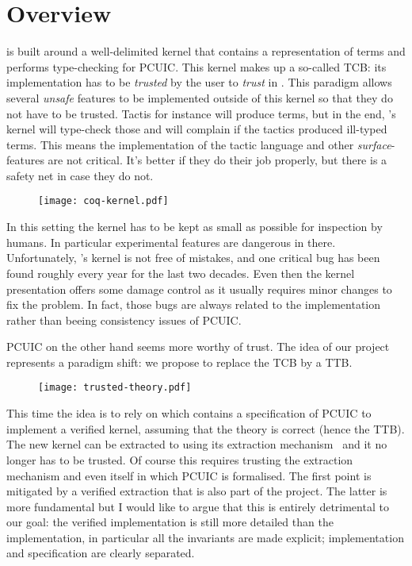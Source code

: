 \chapter{Overview}

\Coq is built around a well-delimited kernel that contains a representation of
terms and performs type-checking for \acrshort{PCUIC}.
This kernel makes up a so-called \acrlong{TCB}: its \ocaml implementation has to
be \emph{trusted} by the user to \emph{trust} in \Coq. This paradigm allows
several \emph{unsafe} features to be implemented outside of this kernel so that
they do not have to be trusted. Tactis for instance will produce terms, but in
the end, \Coq's kernel will type-check those and will complain if the tactics
produced ill-typed terms. This means the implementation of the tactic language
and other \emph{surface}-features are not critical. It's better if they do their
job properly, but there is a safety net in case they do not.
\begin{figure}[hb]
  \texttt{[image: coq-kernel.pdf]}
\end{figure}

In this setting the kernel has to be kept as small as possible for inspection
by humans. In particular experimental features are dangerous in there.
Unfortunately, \Coq's kernel is not free of mistakes, and one critical bug has
been found roughly every year for the last two decades. Even then the kernel
presentation offers some damage control as it usually requires minor changes to
fix the problem.
In fact, those bugs are always related to the implementation rather than beeing
consistency issues of \acrshort{PCUIC}.

\acrshort{PCUIC} on the other hand seems more worthy of trust. The idea of our
project~ represents a paradigm shift: we propose to
replace the \acrshort{TCB} by a \acrfull{TTB}.
\begin{figure}[hb]
  \texttt{[image: trusted-theory.pdf]}
\end{figure}

This time the idea is to rely on \MetaCoq which contains a specification of
\acrshort{PCUIC} to implement a verified kernel, assuming that the theory is
correct (hence the \acrshort{TTB}). The new kernel can be extracted to \Coq
using its extraction mechanism~ and it no longer has to be
trusted. Of course this requires trusting the extraction mechanism and even
\Coq itself in which \acrshort{PCUIC} is formalised.
The first point is mitigated by a verified extraction that is also part of the
project. The latter is more fundamental but I would like to argue that this is
entirely detrimental to our goal: the verified implementation is still more
detailed than the \ocaml implementation, in particular all the invariants
are made explicit; implementation and specification are clearly separated.

